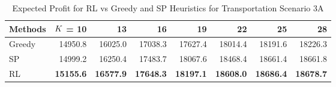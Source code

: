 \documentclass{article} %
\begin{document}



\begin{table}[htp]
\begin{center}
\caption{Expected Profit for RL vs Greedy and SP Heuristics for Transportation Scenario 3A\label{table3}}
\begin{tabular}{lrrrrrrr}
\toprule[1.2pt]
\textbf{Methods} 
& $K$ \textbf{= 10} & \textbf{13} & \textbf{16} & \textbf{19} & \textbf{22} & \textbf{25} & \textbf{28} \\ \hline
Greedy & 14950.8 & 16025.0 & 17038.3 & 17627.4 & 18014.4 & 18191.6 & 18226.3 \\
SP & 14999.2 & 16250.4 & 17483.7 & 18067.6 & 18468.4 & 18661.4 & 18661.8 \\
RL & \textbf{15155.6} & \textbf{16577.9} & \textbf{17648.3} & \textbf{18197.1} & \textbf{18608.0} & \textbf{18686.4} & \textbf{18678.7}\\ \hline
\bottomrule[1.2pt]
\end{tabular}
\end{center}
\end{table}
\end{document}
